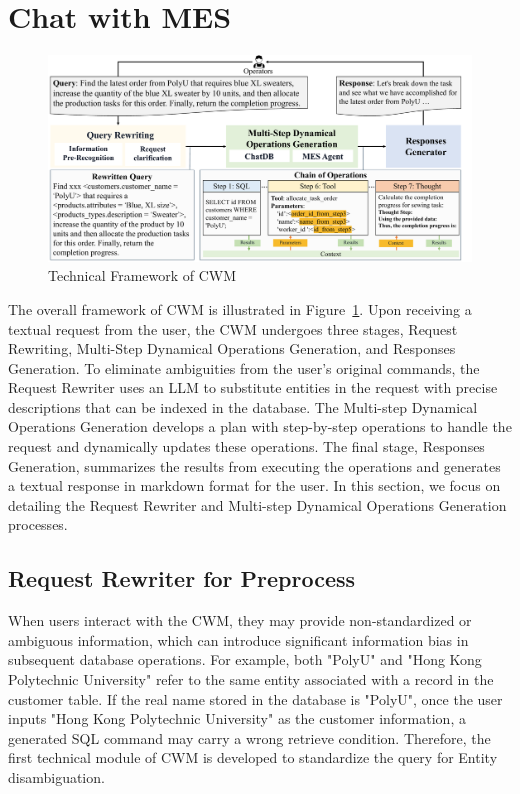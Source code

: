 \documentclass[preprint,12pt]{elsarticle}
\begin{document}
\section{Chat with MES}
\label{sec:method}
\begin{figure}[t]%
\centering%
\includegraphics[width=1.05\linewidth]{figs/flow.pdf}
\caption{Technical Framework of CWM}
\label{fig:cwm_framework}
\end{figure}
The overall framework of CWM is illustrated in Figure~\ref{fig:cwm_framework}.
Upon receiving a textual request from the user, the CWM undergoes three stages, Request Rewriting, Multi-Step Dynamical Operations Generation, and Responses Generation.
To eliminate ambiguities from the user's original commands, the Request Rewriter uses an LLM to substitute entities in the request with precise descriptions that can be indexed in the database.
The Multi-step Dynamical Operations Generation develops a plan with step-by-step operations to handle the request and dynamically updates these operations.
The final stage, Responses Generation, summarizes the results from executing the operations and generates a textual response in markdown format for the user.
In this section, we focus on detailing the Request Rewriter and Multi-step Dynamical Operations Generation processes.


\subsection{Request Rewriter for Preprocess}
When users interact with the CWM, they may provide non-standardized or ambiguous information, which can introduce significant information bias in subsequent database operations.
For example, both "PolyU" and "Hong Kong Polytechnic University" refer to the same entity associated with a record in the customer table.
If the real name stored in the database is "PolyU", once the user inputs "Hong Kong Polytechnic University" as the customer information, a generated SQL command may carry a wrong retrieve condition.
Therefore, the first technical module of CWM is developed to
standardize the query for Entity disambiguation.
\end{document}
